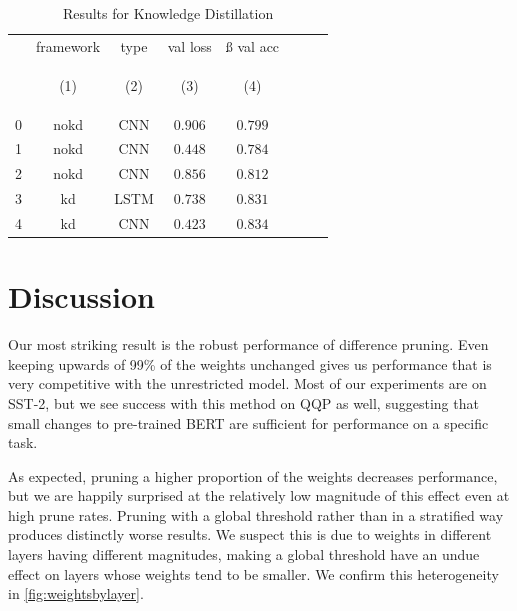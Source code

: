 \documentclass[10pt]{article}
\begin{document}



\begin{table}[tbh]
        \caption{Results for Knowledge Distillation}
        \label{tab:kd_results}
        \centering
        \vspace{1em}
        \begin{tabular}{lccccccc}
\toprule
{} &  framework &  type &  val loss &  ß val acc \\
{} & \hypertarget{tabcol:1}{(1)} & \hypertarget{tabcol:2}{(2)} & \hypertarget{tabcol:3}{(3)} & \hypertarget{tabcol:4}{(4)} \\
\midrule
0 &        nokd &   CNN &   $0.906$ &   $0.799$ \\
1 &        nokd &   CNN &   $0.448$ &   $0.784$ \\
2 &        nokd &   CNN &   $0.856$ &   $0.812$ \\
3 &          kd &  LSTM &   $0.738$ &   $0.831$ \\
4 &          kd &   CNN &   $0.423$ &   $0.834$ \\
\bottomrule
\end{tabular}
\label{tbl:kdresults}
\end{table}

\section{Discussion}

Our most striking result is the robust performance of difference pruning. Even
keeping upwards of 99\% of the weights unchanged gives us performance that is
very competitive with the unrestricted model. Most of our experiments are on
SST-2, but we see success with this method on QQP as well, suggesting that
small changes to pre-trained BERT are sufficient for performance on a specific
task. 

As expected, pruning a higher proportion of the weights decreases performance,
but we are happily surprised at the relatively low magnitude of this effect even
at high prune rates. Pruning with a global threshold rather than in a
stratified way produces distinctly worse results. We suspect this is due to
weights in different layers having different magnitudes, making a global
threshold have an undue effect on layers whose weights tend to be smaller. We
confirm this heterogeneity in \cref{fig:weightsbylayer}.
\end{document}
